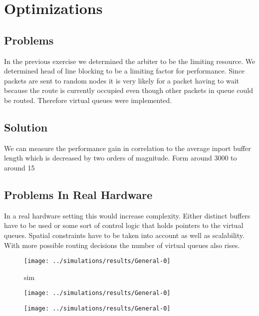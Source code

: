 \documentclass[]{scrartcl}
\begin{document}
\section{Optimizations}
\subsection{Problems}
In the previous exercise we determined the arbiter to be the limiting resource.
We determined head of line blocking to be a limiting factor for performance.
Since packets are sent to random nodes it is very likely for a packet having to
wait because the route is currently occupied even though other packets in queue
could be routed.
Therefore virtual queues were implemented.

\subsection{Solution}
We can measure the performance gain in correlation to the average inport buffer
length which is decreased by two orders of magnitude. Form around 3000 to around
15

\subsection{Problems In Real Hardware}
In a real hardware setting this would increase complexity.
Either distinct buffers have to be used or some sort of control logic that holds
pointers to the virtual queues. Spatial constraints have to be taken into account
as well as scalability. With more possible routing decisions the number of virtual
queues also rises.

\begin{figure}[ht]
    \centering
    \texttt{[image: ../simulations/results/General-0]}
    \caption{sim}%
    \label{fig:optsim_inport_qlen}
\end{figure}
\begin{figure}[ht]
    \centering
    \texttt{[image: ../simulations/results/General-0]}
    \caption{}%
    \label{fig:}
\end{figure}
\begin{figure}[ht]
    \centering
    \texttt{[image: ../simulations/results/General-0]}
    \caption{}%
    \label{fig:}
\end{figure}
\end{document}
